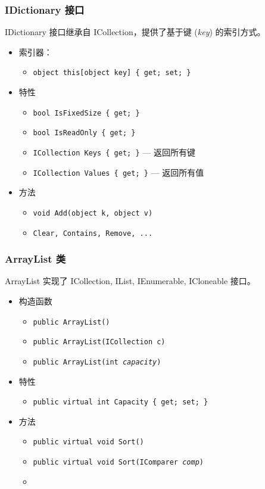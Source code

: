 \begin{frame}
\frametitle{IDictionary 接口}
\CJKindent IDictionary 接口继承自 ICollection，提供了基于键 (\textit{key}) 的索引方式。
\begin{itemize}
\item 索引器：
  \begin{itemize}
  \item \texttt{object this[object key] \{ get; set; \}}
  \end{itemize}
\item 特性
\begin{itemize}
\item \texttt{bool IsFixedSize \{ get; \}}
\item \texttt{bool IsReadOnly \{ get; \}}
\item \texttt{ICollection Keys \{ get; \}} --- 返回所有键
\item \texttt{ICollection Values \{ get; \}} --- 返回所有值
\end{itemize}
\item 方法
\begin{itemize}
\item \texttt{void Add(object k, object v)}
\item \texttt{Clear, Contains, Remove, ...}
\end{itemize}
\end{itemize}
\end{frame}

\begin{frame}
\frametitle{ArrayList 类}
ArrayList 实现了 ICollection, IList, IEnumerable, ICloneable 接口。
\begin{itemize}
\item 构造函数
\begin{itemize}
\item \texttt{public ArrayList()}
\item \texttt{public ArrayList(ICollection c)}
\item \texttt{public ArrayList(int \textit{capacity})}
\end{itemize}
\item 特性
  \begin{itemize}
  \item \texttt{public virtual int Capacity \{ get; set; \}}
  \end{itemize}
\item 方法
  \begin{itemize}
  \item \texttt{public virtual void Sort()}
  \item \texttt{public virtual void Sort(IComparer \textit{comp})}
  \item \href{http://msdn2.microsoft.com/en-us/library/system.collections.arraylist_members.aspx}{}
  \end{itemize}
\end{itemize}
\end{frame}

